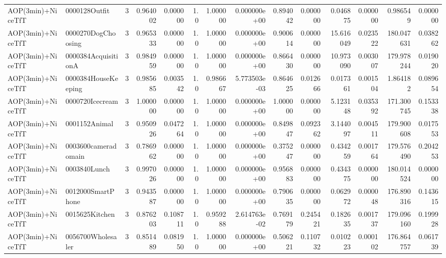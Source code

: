 \begin{tabular}{llrr|r|rr|rr|rr|rrr}
        AOP(3min)+NiceTfT &          0000128Outfit &       3 & 0.964002 & 0.000000 &  1.0 &      1.000000 & 0.000000e+00 &      0.894042 & 0.000000 &      0.046875 &    0.000000 &     0.986549 &    0.000000 \\
        AOP(3min)+NiceTfT &     0000270DogChoosing &       3 & 0.965333 & 0.000000 &  1.0 &      1.000000 & 0.000000e+00 &      0.900614 & 0.000000 &     15.616049 &    0.023522 &   180.047631 &    0.038262 \\
        AOP(3min)+NiceTfT &    0000384AcquisitionA &       3 & 0.984959 & 0.000000 &  1.0 &      1.000000 & 0.000000e+00 &      0.866430 & 0.000000 &     10.973090 &    0.003007 &   179.978244 &    0.019020 \\
        AOP(3min)+NiceTfT &    0000384HouseKeeping &       3 & 0.985685 & 0.003542 &  1.0 &      0.986667 & 5.773503e-03 &      0.864625 & 0.012666 &      0.017361 &    0.001504 &     1.864182 &    0.089654 \\
        AOP(3min)+NiceTfT &        0000720Icecream &       3 & 1.000000 & 0.000000 &  1.0 &      1.000000 & 0.000000e+00 &      1.000000 & 0.000000 &      5.123148 &    0.035392 &   171.300745 &    0.153338 \\
        AOP(3min)+NiceTfT &          0001152Animal &       3 & 0.950926 & 0.047264 &  1.0 &      1.000000 & 0.000000e+00 &      0.849847 & 0.092362 &      3.144097 &    0.004511 &   179.900608 &    0.017553 \\
        AOP(3min)+NiceTfT &    0003600cameradomain &       3 & 0.786962 & 0.000000 &  1.0 &      1.000000 & 0.000000e+00 &      0.375247 & 0.000000 &      0.434259 &    0.001764 &   179.576490 &    0.204253 \\
        AOP(3min)+NiceTfT &           0003840Lunch &       3 & 0.997026 & 0.000000 &  1.0 &      1.000000 & 0.000000e+00 &      0.956883 & 0.000000 &      0.434375 &    0.000000 &   180.014524 &    0.000000 \\
        AOP(3min)+NiceTfT &      0012000SmartPhone &       3 & 0.943587 & 0.000000 &  1.0 &      1.000000 & 0.000000e+00 &      0.790635 & 0.000000 &      0.062972 &    0.000048 &   176.890316 &    0.143615 \\
        AOP(3min)+NiceTfT &         0015625Kitchen &       3 & 0.876203 & 0.108711 &  1.0 &      0.959288 & 2.614763e-02 &      0.769179 & 0.245421 &      0.182635 &    0.001737 &   179.096160 &    0.199928 \\
        AOP(3min)+NiceTfT &      0056700Wholesaler &       3 & 0.851489 & 0.081950 &  1.0 &      1.000000 & 0.000000e+00 &      0.506221 & 0.110732 &      0.010223 &    0.000102 &   176.864757 &    0.061739 \\

\end{tabular}
